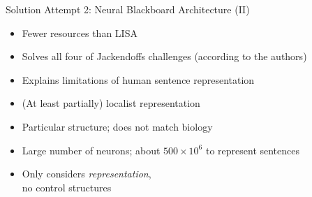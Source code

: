 \documentclass[handout,aspectratio=169]{beamer}
\begin{document}
	\begin{frame}{Solution Attempt 2: Neural Blackboard Architecture (II)}
		\centering
		\begin{multicols}{2}
			\begin{itemize}
				\setlength{\itemsep}{0.33cm}
				\item[\OPlus] Fewer resources than LISA
				\item[\OPlus] Solves all four of Jackendoffs challenges (according to the authors)
				\item[\OPlus] Explains limitations of human sentence representation
				\item[\OMeh] (At least partially) localist representation
				\columnbreak
				\item[\OMinus] Particular structure; does not match biology
				\item[\OMinus] Large number of neurons; about $500\times 10^6$ to represent sentences
				\item[\OMinus] Only considers \emph{representation},\\no control structures
			\end{itemize}
		\end{multicols}
	\end{frame}
\end{document}
